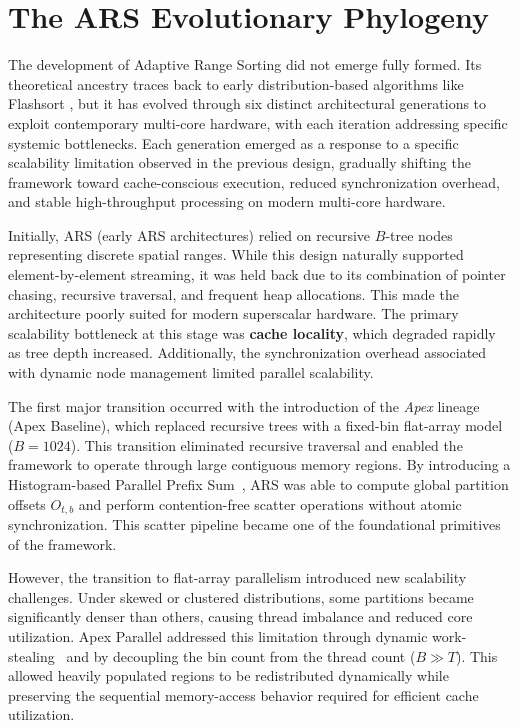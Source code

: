 \section{The ARS Evolutionary Phylogeny}
The development of Adaptive Range Sorting did not emerge fully formed. Its theoretical ancestry traces back to early distribution-based algorithms like Flashsort \cite{DrDobbsJournala}, but it has evolved through six distinct architectural generations to exploit contemporary multi-core hardware, with each iteration addressing specific systemic bottlenecks.
Each generation emerged as a response to a specific scalability limitation observed in the previous design, gradually shifting the framework toward cache-conscious execution, reduced synchronization overhead, and stable high-throughput processing on modern multi-core hardware.

Initially, ARS (early ARS architectures) relied on recursive $B$-tree nodes representing discrete spatial ranges.
While this design naturally supported element-by-element streaming, it was held back due to its combination of pointer chasing, recursive traversal, and frequent heap allocations.
This made the architecture poorly suited for modern superscalar hardware.
The primary scalability bottleneck at this stage was \textbf{cache locality}, which degraded rapidly as tree depth increased. Additionally, the synchronization overhead associated with dynamic node management limited parallel scalability.

The first major transition occurred with the introduction of the \textit{Apex} lineage (Apex Baseline), which replaced recursive trees with a fixed-bin flat-array model ($B = 1024$). 
This transition eliminated recursive traversal and enabled the framework to operate through large contiguous memory regions. 
By introducing a Histogram-based Parallel Prefix Sum~\cite{blellochPrefixSumsTheir1990}, ARS was able to compute global partition offsets $O_{t,b}$ and perform contention-free scatter operations without atomic synchronization. 
This scatter pipeline became one of the foundational primitives of the framework.

However, the transition to flat-array parallelism introduced new scalability challenges. 
Under skewed or clustered distributions, some partitions became significantly denser than others, causing thread imbalance and reduced core utilization. 
Apex Parallel addressed this limitation through dynamic work-stealing~\cite{blumofeSchedulingMultithreadedComputations1999} and by decoupling the bin count from the thread count ($B \gg T$). 
This allowed heavily populated regions to be redistributed dynamically while preserving the sequential memory-access behavior required for efficient cache utilization.


